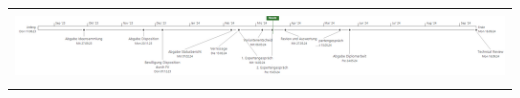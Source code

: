 \begin{table}[H]
{\begin{tabular}{lllllll}
\multicolumn{7}{l}{}                                                                                                                                                                                                                                                                                                                                                                                                                                                                                                                                                                                                                                                                                                                                                                   \\
\multicolumn{7}{l}{\includegraphics[width=2\linewidth]{source/status_report/main/second_report_timeline}}                                                                                                                                                                                                                                                                                                                                                                                                                                                                                                                                                                                                                                                                           \\
\multicolumn{7}{l}{}                                                                                                                                                                                                                                                                                                                                                                                                                                                                                                                                                                                                                                                                                                                                                                   \\

\end{tabular}}
\end{table}
